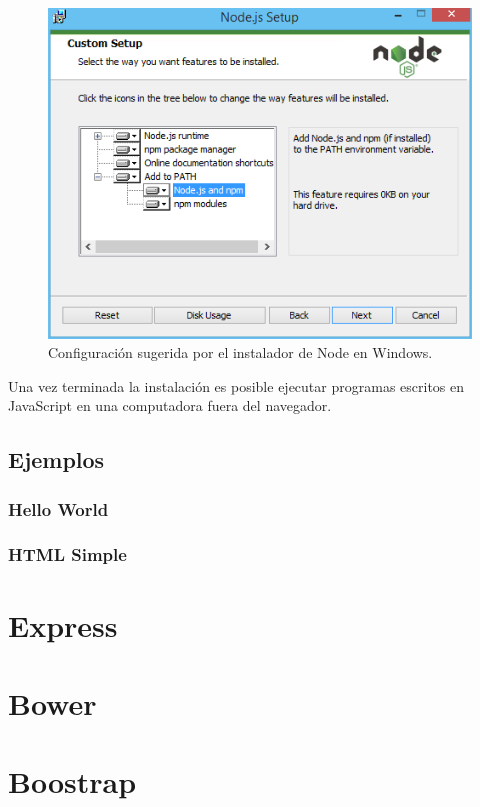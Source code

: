 \documentclass[10pt,a4paper]{report}
\begin{document}
\begin{figure}[h!]
	\centering
	\includegraphics[scale=0.65]{images/node-installation}
	\caption{Configuración sugerida por el instalador de Node en Windows.}\label{fig:node-installation}
\end{figure}

Una vez terminada la instalación es posible ejecutar programas escritos en JavaScript en una computadora fuera del navegador.

\subsection{Ejemplos}

\subsubsection{Hello World}

\subsubsection{HTML Simple}

\section{Express}

\section{Bower}

\section{Boostrap}
\end{document}
